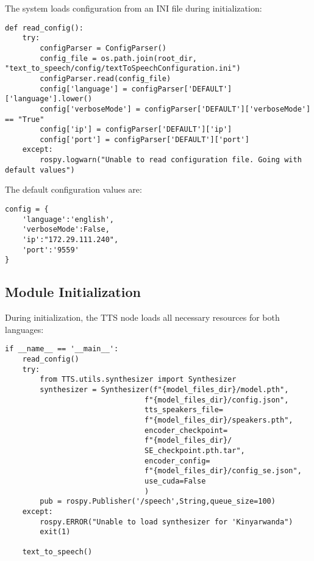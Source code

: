 \documentclass{CSSRforAfrica}
\begin{document}
The system loads configuration from an INI file during initialization:

\begin{lstlisting}[style=commandstyle]
def read_config():
    try:
        configParser = ConfigParser()
        config_file = os.path.join(root_dir, "text_to_speech/config/textToSpeechConfiguration.ini")
        configParser.read(config_file)
        config['language'] = configParser['DEFAULT']['language'].lower()
        config['verboseMode'] = configParser['DEFAULT']['verboseMode'] == "True"
        config['ip'] = configParser['DEFAULT']['ip']
        config['port'] = configParser['DEFAULT']['port']
    except:
        rospy.logwarn("Unable to read configuration file. Going with default values")
\end{lstlisting}

\newpage

The default configuration values are:
\begin{lstlisting}[style=commandstyle]
config = {
    'language':'english',
    'verboseMode':False,
    'ip':"172.29.111.240",
    'port':'9559'
}
\end{lstlisting}

\subsection{Module Initialization}

During initialization, the TTS node loads all necessary resources for both languages:

\begin{lstlisting}[style=commandstyle]
if __name__ == '__main__':
    read_config()
    try:
        from TTS.utils.synthesizer import Synthesizer
        synthesizer = Synthesizer(f"{model_files_dir}/model.pth",
                                f"{model_files_dir}/config.json",
                                tts_speakers_file=
                                f"{model_files_dir}/speakers.pth",
                                encoder_checkpoint=
                                f"{model_files_dir}/
                                SE_checkpoint.pth.tar",
                                encoder_config=
                                f"{model_files_dir}/config_se.json",
                                use_cuda=False
                                )
        pub = rospy.Publisher('/speech',String,queue_size=100)
    except:
        rospy.ERROR("Unable to load synthesizer for 'Kinyarwanda")
        exit(1)
    
    text_to_speech()
\end{lstlisting}
\end{document}
